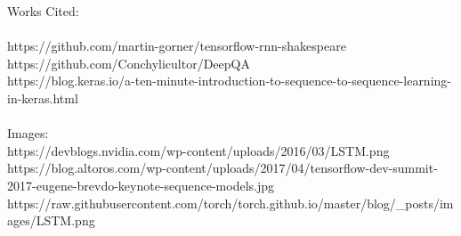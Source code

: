 \documentclass[titlepage]{article}
\begin{document}
\newpage
\large{Works Cited:}\\
\small{
\\https://github.com/martin-gorner/tensorflow-rnn-shakespeare 
\\https://github.com/Conchylicultor/DeepQA
\\https://blog.keras.io/a-ten-minute-introduction-to-sequence-to-sequence-learning-in-keras.html
}
~\\~\\
\large{Images:}
\small{
\\https://devblogs.nvidia.com/wp-content/uploads/2016/03/LSTM.png
\\https://blog.altoros.com/wp-content/uploads/2017/04/tensorflow-dev-summit-2017-eugene-brevdo-keynote-sequence-models.jpg
\\https://raw.githubusercontent.com/torch/torch.github.io/master/blog/\_posts/images/LSTM.png
}\\
\nocite{*}


\end{document}
